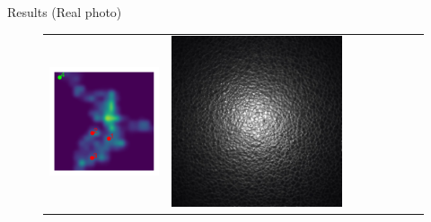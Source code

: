 \documentclass[final]{beamer}
\newlength{\twocolwid}
\newlength{\resultwidth}
\begin{document}
\begin{frame}[t]
\begin{columns}[t]
\begin{column}{\twocolwid}
\begin{block}{Results (Real photo)}
\begin{figure}[t]
\begin{tabular}{ccrclccc}
            		\includegraphics[width=\resultwidth]{real/leather/posterior.pdf} &
            		\includegraphics[width=\resultwidth]{real/leather/good1.jpg} &

\end{tabular}
\end{figure}
\end{block}
\end{column}
\end{columns}
\end{frame}
\end{document}
